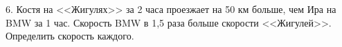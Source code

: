 6. Костя на <<Жигулях>> за 2 часа проезжает на 50 км больше, чем Ира на BMW за 1 час. Скорость BMW в 1,5 раза больше скорости <<Жигулей>>. Определить скорость каждого.\\
